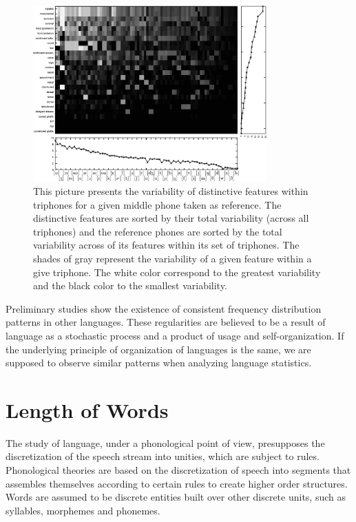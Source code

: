 \begin{figure}
\centering  
\includegraphics[width=0.8\textwidth]{images/phone_triphone_varialibity_dist_features_sorted2.pdf}  
\caption{This picture presents the variability of distinctive features within triphones for a given
middle phone taken as reference. The distinctive features are sorted by their total variability 
(across all triphones) and the reference phones are sorted by the total variability across of its 
features within its set of triphones. The shades of gray represent the variability of a given 
feature within a give triphone. The white color correspond to the greatest variability and the
black color to the smallest variability.}
\label{fig:phone_triphone_varialibity_dist_features_sorted2}  
\end{figure}




Preliminary studies show the existence of consistent frequency distribution patterns in other languages.
These regularities are believed to be a result of language as a stochastic process and a product
of usage and self-organization. If the underlying principle of organization of languages is the same,
we are supposed to observe similar patterns when analyzing language statistics.







\section{Length of Words}
\label{sec:words_length}
The study of language, under a phonological point of view, presupposes
the discretization of the speech stream into unities, which are subject to rules.
Phonological theories are based on the discretization of speech into segments
that assembles themselves according to certain rules to create higher order
structures. 
Words are assumed to be discrete entities built over other discrete
units, such as syllables, morphemes and phonemes.

